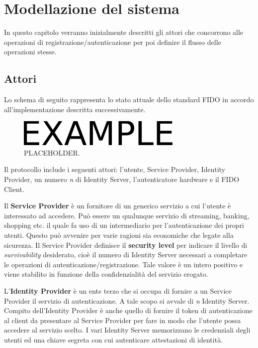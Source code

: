 \chapter{Modellazione del sistema}
\label{modellazione}

In questo capitolo verranno inizialmente descritti gli attori che concorrono alle operazioni di registrazione/autenticazione per poi definire il flusso delle operazioni stesse.

\section{Attori}
\label{attori}

Lo schema di seguito rappresenta lo stato attuale dello standard FIDO in accordo all'implementazione descritta successivamente.
\begin{figure}[htb]
	\centering
	\includegraphics[width=.4\columnwidth]{figures/example.pdf}
	\caption{PLACEHOLDER.}
	\label{fig:esempio}
\end{figure}

Il protocollo include i seguenti attori: l'utente, Service Provider, Identity Provider, un numero \emph{n} di Identity Server, l'autenticatore hardware e il FIDO Client. 

Il \textbf{Service Provider} è un fornitore di un generico servizio a cui l'utente è interessato ad accedere. Può essere un qualunque servizio di streaming, banking, shopping etc. il quale fa uso di un intermediario per l'autenticazione dei propri utenti. Questo può avvenire per varie ragioni sia economiche che legate alla sicurezza. 
Il Service Provider definisce il \textbf{security level} per indicare il livello di \emph{survivability} desiderato, cioè il numero di Identity Server necessari a completare le operazioni di autenticazione/registrazione. Tale valore è un intero positivo e viene stabilito in funzione della confidenzialità del servizio erogato.

L'\textbf{Identity Provider} è un ente terzo che si occupa di fornire a un Service Provider il servizio di autenticazione. A tale scopo si avvale di \emph{n} Identity Server.
Compito dell'Identity Provider è anche quello di fornire il token di autenticazione al client da presentare al Service Provider per fare in modo che l'utente possa accedere al servizio scelto.
I vari Identity Server memorizzano le credenziali degli utenti ed una chiave segreta con cui autenticare attestazioni di identità.

